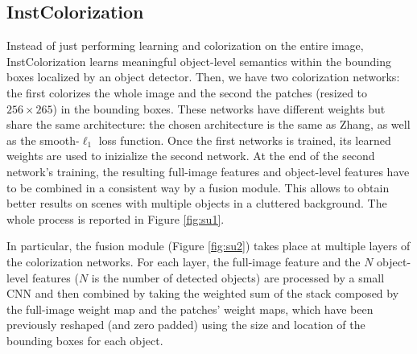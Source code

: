 \subsection{InstColorization}
Instead of just performing learning and colorization on the entire image, InstColorization learns meaningful object-level semantics within the bounding boxes localized by an object detector. Then, we have two colorization networks: the first colorizes the whole image and the second the patches (resized to $256\times265$) in the bounding boxes. These networks have different weights but share the same architecture: the chosen architecture is the same as Zhang, as well as the smooth-$\ell_1$ loss function. Once the first networks is trained, its learned weights are used to inizialize the second network. At the end of the second network's training, the resulting full-image features and object-level features have to be combined in a consistent way by a fusion module. This allows to obtain better results on scenes with multiple objects in a cluttered background. The whole process is reported in Figure \ref{fig:su1}.

In particular, the fusion module (Figure \ref{fig:su2}) takes place at multiple layers of the colorization networks. For each layer, the full-image feature and the $N$ object-level features ($N$ is the number of detected objects) are processed by a small CNN and then combined by taking the weighted sum of the stack composed by the full-image weight map and the patches' weight maps, which have been previously reshaped (and zero padded) using the size and location of the bounding boxes for each object.


